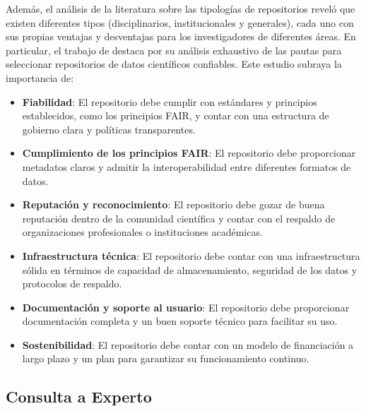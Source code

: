 \documentclass{article}
\begin{document}
Además, el análisis de la literatura sobre las tipologías de repositorios reveló que existen diferentes tipos (disciplinarios, institucionales y generales), cada uno con sus propias ventajas y desventajas para los investigadores de diferentes áreas.
En particular, el trabajo de \cite{Jiang2023GlobalRepo} destaca por su análisis exhaustivo de las pautas para seleccionar repositorios de datos científicos confiables. Este estudio subraya la importancia de:
\begin{itemize}
    \item \textbf{Fiabilidad}: El repositorio debe cumplir con estándares y principios establecidos, como los principios FAIR, y contar con una estructura de gobierno clara y políticas transparentes.
    \item \textbf{Cumplimiento de los principios FAIR}: El repositorio debe proporcionar metadatos claros y admitir la interoperabilidad entre diferentes formatos de datos.
    \item \textbf{Reputación y reconocimiento}: El repositorio debe gozar de buena reputación dentro de la comunidad científica y contar con el respaldo de organizaciones profesionales o instituciones académicas.
    \item \textbf{Infraestructura técnica}: El repositorio debe contar con una infraestructura sólida en términos de capacidad de almacenamiento, seguridad de los datos y protocolos de respaldo.
    \item \textbf{Documentación y soporte al usuario}: El repositorio debe proporcionar documentación completa y un buen soporte técnico para facilitar su uso.
    \item \textbf{Sostenibilidad}: El repositorio debe contar con un modelo de financiación a largo plazo y un plan para garantizar su funcionamiento continuo.
\end{itemize}

\subsection{Consulta a Experto}
\end{document}

